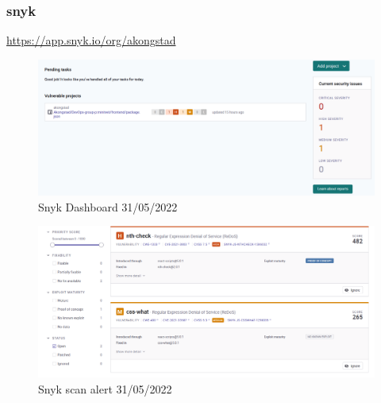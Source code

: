 \subsubsection{snyk}
\label{app:codeAnalSnyk}
\href{https://app.snyk.io/org/akongstad}{https://app.snyk.io/org/akongstad}
\begin {figure}[H]
    \centering
    \includegraphics[scale=0.40]{images/analysis_tools/snykDashboard.PNG}
    \caption{Snyk Dashboard 31/05/2022}
    \label{fig:snykAlert}
\end{figure}

\begin {figure}[H]
    \centering
    \includegraphics[scale=0.40]{images/analysis_tools/alertSnyk.PNG}
    \caption{Snyk scan alert 31/05/2022}
    \label{fig:snykAlert}
\end{figure}

